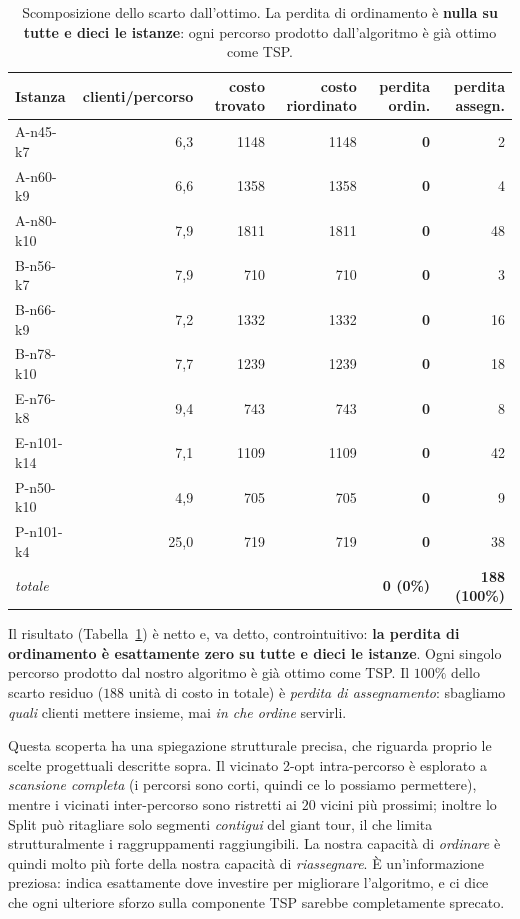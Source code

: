 \documentclass[10pt,a4paper]{article}
\begin{document}
\begin{table}[H]
\centering
\small
\caption{Scomposizione dello scarto dall'ottimo. La perdita di ordinamento è
\textbf{nulla su tutte e dieci le istanze}: ogni percorso prodotto
dall'algoritmo è già ottimo come TSP.}
\label{tab:scomposizione}
\begin{tabular}{lrrrrr}
\toprule
Istanza & clienti/percorso & costo trovato & costo riordinato & perdita ordin. & perdita assegn. \\
\midrule
A-n45-k7   & 6,3  & 1148 & 1148 & \textbf{0} & 2 \\
A-n60-k9   & 6,6  & 1358 & 1358 & \textbf{0} & 4 \\
A-n80-k10  & 7,9  & 1811 & 1811 & \textbf{0} & 48 \\
B-n56-k7   & 7,9  & 710  & 710  & \textbf{0} & 3 \\
B-n66-k9   & 7,2  & 1332 & 1332 & \textbf{0} & 16 \\
B-n78-k10  & 7,7  & 1239 & 1239 & \textbf{0} & 18 \\
E-n76-k8   & 9,4  & 743  & 743  & \textbf{0} & 8 \\
E-n101-k14 & 7,1  & 1109 & 1109 & \textbf{0} & 42 \\
P-n50-k10  & 4,9  & 705  & 705  & \textbf{0} & 9 \\
P-n101-k4  & 25,0 & 719  & 719  & \textbf{0} & 38 \\
\midrule
\multicolumn{4}{l}{\emph{totale}} & \textbf{0 (0\%)} & \textbf{188 (100\%)} \\
\bottomrule
\end{tabular}
\end{table}

Il risultato (Tabella~\ref{tab:scomposizione}) è netto e, va detto,
controintuitivo: \textbf{la perdita di ordinamento è esattamente zero su tutte e
dieci le istanze}. Ogni singolo percorso prodotto dal nostro algoritmo è già
ottimo come TSP. Il $100\%$ dello scarto residuo ($188$ unità di costo in totale)
è \emph{perdita di assegnamento}: sbagliamo \emph{quali} clienti mettere insieme,
mai \emph{in che ordine} servirli.

Questa scoperta ha una spiegazione strutturale precisa, che riguarda proprio le
scelte progettuali descritte sopra. Il vicinato 2-opt intra-percorso è esplorato
a \emph{scansione completa} (i percorsi sono corti, quindi ce lo possiamo
permettere), mentre i vicinati inter-percorso sono ristretti ai $20$ vicini più
prossimi; inoltre lo Split può ritagliare solo segmenti \emph{contigui} del giant
tour, il che limita strutturalmente i raggruppamenti raggiungibili. La nostra
capacità di \emph{ordinare} è quindi molto più forte della nostra capacità di
\emph{riassegnare}. È un'informazione preziosa: indica esattamente dove
investire per migliorare l'algoritmo, e ci dice che ogni ulteriore sforzo sulla
componente TSP sarebbe completamente sprecato.
\end{document}
